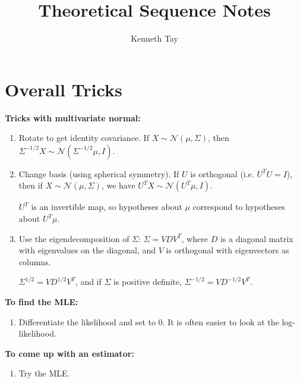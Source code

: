 \documentclass[twoside]{article}
\newcommand\calN{\mathcal{N}}
\newcommand\Sg{\Sigma}
\begin{document}
\title{Theoretical Sequence Notes}
\author{Kenneth Tay}
\date{\vspace{-3ex}}
\maketitle

\section{Overall Tricks}
\textbf{Tricks with multivariate normal:}
\begin{enumerate}
\item Rotate to get identity covariance. If $X \sim \calN(\mu, \Sg)$, then $\Sg^{-1/2} X \sim \calN(\Sg^{-1/2}\mu, I)$.

\item Change basis (using spherical symmetry). If $U$ is orthogonal (i.e. $U^T U = I$), then if $X \sim \calN(\mu, \Sg)$, we have $U^T X \sim \calN(U^T \mu, I)$.

$U^T$ is an invertible map, so hypotheses about $\mu$ correspond to hypotheses about $U^T \mu$.

\item Use the eigendecomposition of $\Sg$: $\Sg = VDV^T$, where $D$ is a diagonal matrix with eigenvalues on the diagonal, and $V$ is orthogonal with eigenvectors as columns.

$\Sg^{1/2} = VD^{1/2}V^T$, and if $\Sg$ is positive definite, $\Sg^{-1/2} = VD^{-1/2}V^T$.
\end{enumerate}

\textbf{To find the MLE:}
\begin{enumerate}
\item Differentiate the likelihood and set to 0. It is often easier to look at the log-likelihood.

\end{enumerate}

\textbf{To come up with an estimator:}
\begin{enumerate}
\item Try the MLE.
\end{enumerate}

\end{document}
